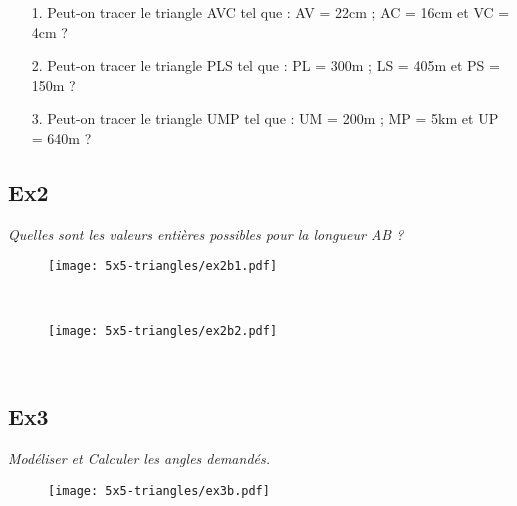\begin{enumerate}
  \item[1.] Peut-on tracer le triangle AVC tel que : AV = 22cm ; AC = 16cm et VC = 4cm ?  \\ \Pointilles[2]
  \item[2.] Peut-on tracer le triangle PLS tel que : PL = 300m ; LS = 405m et PS = 150m ?  \\ \Pointilles[2]
  \item[3.] Peut-on tracer le triangle UMP tel que : UM = 200m ; MP = 5km et UP = 640m ?   \\ \Pointilles[2]
\end{enumerate} 


\subsection*{Ex2}
\textit{Quelles sont les valeurs entières possibles pour la longueur AB ?}

\begin{minipage}[t]{0.4\textwidth}
\begin{figure}[H]
  \centering
  \texttt{[image: 5x5-triangles/ex2b1.pdf]}
\end{figure}
\end{minipage}
\begin{minipage}[t]{0.6\textwidth}
  \Pointilles[8] \\
\end{minipage}

\begin{minipage}[t]{0.4\textwidth}
\begin{figure}[H]
  \centering
  \texttt{[image: 5x5-triangles/ex2b2.pdf]}
\end{figure}
\end{minipage}
\begin{minipage}[t]{0.6\textwidth}
  \Pointilles[8] \\
\end{minipage}


\subsection*{Ex3}
\textit{Modéliser et Calculer les angles demandés.}

\begin{figure}[H]
  \centering
  \texttt{[image: 5x5-triangles/ex3b.pdf]}
\end{figure}

